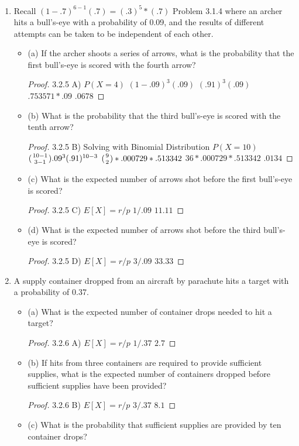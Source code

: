\documentclass{article}
\begin{document}
\begin{enumerate}
\begin{itemize}
\begin{proof}
$.216+.0864+.20736+.013824+.0055296$
$.9037$
\end{proof}
                \end{itemize}
            \item Recall $(1-.7)^{6-1}(.7) = (.3)^{5}*(.7)$ Problem 3.1.4 where an archer hits a bull’s-eye with a probability of 0.09, and the results of different attempts can be taken to be independent of each other. 
                \begin{itemize}
                    \item (a) If the archer shoots a series of arrows, what is the probability that the first bull’s-eye is scored with the fourth arrow?
\begin{proof}
3.2.5 A)
$P(X=4)$
$(1-.09)^{3}(.09)$
$(.91)^{3}(.09)$
$.753571*.09$
$.0678$
\end{proof}
                    \item (b) What is the probability that the third bull’s-eye is scored with the tenth arrow?
\begin{proof}
3.2.5 B)
Solving with Binomial Distribution
$ P(X=10) $
$({10-1 \atop 3-1}).09^{3}(.91)^{10-3}$
$({9 \atop 2})*.000729*.513342 $
$36*.000729*.513342$
$.0134$
\end{proof}
                    \item (c) What is the expected number of arrows shot before the first bull’s-eye is scored?
\begin{proof}
3.2.5 C)
$E[X]= r/p$
$1/.09$
$11.11$
\end{proof}
                    \item (d) What is the expected number of arrows shot before the third bull’s-eye is scored?
\begin{proof}
3.2.5 D)
$E[X] = r/p$
$3/.09$
$33.33$
\end{proof}
                \end{itemize}
            \item A supply container dropped from an aircraft by parachute hits a target with a probability of 0.37. 
                \begin{itemize}
                    \item (a) What is the expected number of container drops needed to hit a target?
\begin{proof}
3.2.6 A)
$E[X] = r/p$
$ 1/.37$
$2.7$
\end{proof}
                    \item (b) If hits from three containers are required to provide sufficient supplies, what is the expected number of containers dropped before sufficient supplies have been provided?
\begin{proof}
3.2.6 B)
$E[X] = r/p$
$3/.37$
$8.1$
\end{proof}
                    \item (c) What is the probability that sufficient supplies are provided by ten container drops?
                \end{itemize} 
    \end{enumerate}
\end{document}
